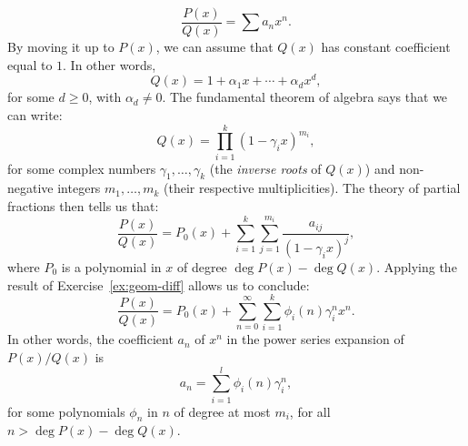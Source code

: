 \documentclass{amsbook}
\theoremstyle{definition}
\theoremstyle{remark}
\begin{document}
\begin{displaymath}
  \frac{P(x)}{Q(x)} = \sum a_n x^n.
\end{displaymath}
By moving it up to $P(x)$, we can assume that $Q(x)$ has constant coefficient equal to $1$.
In other words,
\begin{displaymath}
  Q(x) = 1+\alpha_1 x + \dotsb + \alpha_d x^d,
\end{displaymath}
for some $d\geq 0$, with $\alpha_d\neq 0$.
The fundamental theorem of algebra says that we can write:
\begin{displaymath}
  Q(x) = \prod_{i=1}^k (1-\gamma_i x)^{m_i},
\end{displaymath}
for some complex numbers $\gamma_1,\dotsc,\gamma_k$ (the \emph{inverse roots} of $Q(x)$) and non-negative integers $m_1,\dotsc,m_k$ (their respective multiplicities).
The theory of partial fractions then tells us that:
\begin{displaymath}
  \frac{P(x)}{Q(x)} = P_0(x) + \sum_{i=1}^k \sum_{j=1}^{m_i} \frac{a_{ij}}{(1-\gamma_i x)^j},
\end{displaymath}
where $P_0$ is a polynomial in $x$ of degree $\deg P(x)-\deg Q(x)$.
Applying the result of Exercise~\ref{ex:geom-diff} allows us to conclude:
\begin{displaymath}
  \frac{P(x)}{Q(x)} = P_0(x) + \sum_{n=0}^\infty \sum_{i=1}^k \phi_i(n)\gamma_i^nx^n.
\end{displaymath}
In other words, the coefficient $a_n$ of $x^n$ in the power series expansion of $P(x)/Q(x)$ is
\begin{displaymath}
  a_n = \sum_{i=1}^l \phi_i(n)\gamma_i^n,
\end{displaymath}
for some polynomials $\phi_n$ in $n$ of degree at most $m_i$, for all $n>\deg P(x) - \deg Q(x)$.


\end{document}
